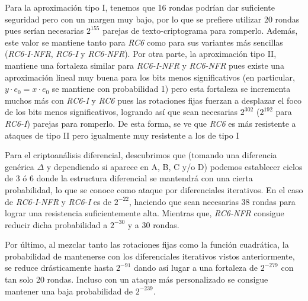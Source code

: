 	Para la aproximación tipo I, tenemos que 16 rondas podrían dar suficiente seguridad pero con un margen muy bajo, por lo que se prefiere utilizar 20 rondas pues serían necesarias $2^{155}$ parejas de texto-criptograma para romperlo. Además, este valor se mantiene tanto para \textit{RC6} como para sus variantes más sencillas (\textit{RC6-I-NFR}, \textit{RC6-I} y \textit{RC6-NFR}). Por otra parte, la aproximación tipo II, mantiene una fortaleza similar para \textit{RC6-I-NFR} y \textit{RC6-NFR} pues existe una aproximación lineal muy buena para los bits menos significativos (en particular, $y \cdot e_0 = x \cdot e_0$ se mantiene con probabilidad 1) pero esta fortaleza se incrementa muchos más con \textit{RC6-I} y \textit{RC6} pues las rotaciones fijas fuerzan a desplazar el foco de los bits menos significativos, logrando así que sean necesarias $2^{302}$ ($2^{192}$ para \textit{RC6-I}) parejas para romperlo. De esta forma, se ve que \textit{RC6} es más resistente a ataques de tipo II pero igualmente muy resistente a los de tipo I
	
	Para el criptoanálisis diferencial, descubrimos que (tomando una diferencia genérica $\Delta$ y dependiendo si aparece en A, B, C y/o D) podemos establecer ciclos de 3 ó 6 donde la estructura diferencial se mantendrá con una cierta probabilidad, lo que se conoce como ataque por diferenciales iterativos. En el caso de \textit{RC6-I-NFR} y \textit{RC6-I} es de $2^{-22}$, haciendo que sean necesarias 38 rondas para lograr una resistencia suficientemente alta. Mientras que, \textit{RC6-NFR} consigue reducir dicha probabilidad a $2^{-30}$ y a 30 rondas.
		
	Por último, al mezclar tanto las rotaciones fijas como la función cuadrática, la probabilidad de mantenerse con los diferenciales iterativos vistos anteriormente, se reduce drásticamente hasta $2^{-91}$ dando así lugar a una fortaleza de $2^{-279}$ con tan solo 20 rondas. Incluso con un ataque más personalizado se consigue mantener una baja probabilidad de $2^{-239}$.